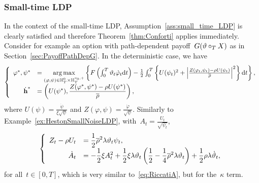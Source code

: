 \subsubsection{Small-time LDP}
In the context of the small-time LDP,  Assumption~\ref{ass:small_time_LDP} is clearly satisfied and therefore Theorem~\ref{thm:Conforti} applies immediately.
Consider for example an option with path-dependent payoff~$G(\vartheta\circ_{T} X)$ 
as in Section~\ref{sec:PayoffPathDepG}.
In the deterministic case, we have
\begin{equation*}
\left\{
\begin{array}{rl}
\varphi^{*},\psi^{*}
& = \operatorname*{arg\,max}\limits_{(\varphi,\psi) \in \mathbb{H}_T^0\times \mathbb{H}_T^{v_0,+}} \left\{F\left(\int_0^T\vartheta_t \dot{\varphi}_t \mathrm{d} t\right) - \frac{1}{2}\int_0^T \left\{U(\psi_t)^2 + \left|\frac{Z(\varphi_t,\psi_t) - \rho U(\psi_t)}{\overline{\rho}}\right|^2\right\}\mathrm{d} t\right\},\\
\dot{\boldsymbol{\mathrm{h}}}^{*} & = \displaystyle 
\left(U(\psi^{*}),  \frac{Z(\varphi^{*},\psi^{*}) - \rho U(\psi^{*})}{\overline{\rho}}\right),
\end{array}
\right.
\end{equation*}
where
$U(\psi) = \frac{\dot{\psi}}{\xi \sqrt{\psi}}$
and
$Z(\varphi,\psi) = \frac{\dot{\varphi}}{\sqrt{\psi}}$.
Similarly to Example~\ref{ex:HestonSmallNoiseLDP}, 
with~$A_t = \frac{U_t}{\sqrt{\psi_t}}$,
\begin{equation*}
\left\{
\begin{array}{rl}
\displaystyle Z_t - \rho U_t &= \displaystyle \frac{1}{2} \overline{\rho}^2 \lambda \vartheta_t \psi_t,\\
\displaystyle \dot{A}_t
&= \displaystyle -\frac{1}{2}\xi A_t^2 + \frac{1}{2}\xi \lambda \vartheta_t \left(\frac{1}{2} - \frac{1}{4}\overline{\rho}^2\lambda\vartheta_t \right) + \frac{1}{2}\rho\lambda\dot{\vartheta}_t,
\end{array}
\right.
\end{equation*}
for all~$t\in[0,T]$,
which is very similar to~\eqref{eq:RiccatiA}, 
but for the~$\kappa$ term.
